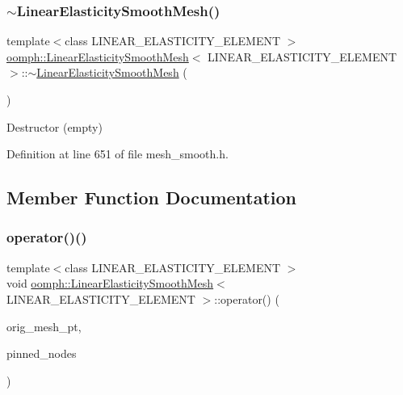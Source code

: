 \subsubsection{\texorpdfstring{$\sim$\+Linear\+Elasticity\+Smooth\+Mesh()}{~LinearElasticitySmoothMesh()}}
{\footnotesize\ttfamily template$<$class L\+I\+N\+E\+A\+R\+\_\+\+E\+L\+A\+S\+T\+I\+C\+I\+T\+Y\+\_\+\+E\+L\+E\+M\+E\+NT $>$ \\
\hyperlink{classoomph_1_1LinearElasticitySmoothMesh}{oomph\+::\+Linear\+Elasticity\+Smooth\+Mesh}$<$ L\+I\+N\+E\+A\+R\+\_\+\+E\+L\+A\+S\+T\+I\+C\+I\+T\+Y\+\_\+\+E\+L\+E\+M\+E\+NT $>$\+::$\sim$\hyperlink{classoomph_1_1LinearElasticitySmoothMesh}{Linear\+Elasticity\+Smooth\+Mesh} (\begin{DoxyParamCaption}{ }\end{DoxyParamCaption})\hspace{0.3cm}{\ttfamily [inline]}}



Destructor (empty) 



Definition at line 651 of file mesh\+\_\+smooth.\+h.



\subsection{Member Function Documentation}
\mbox{\label{classoomph_1_1LinearElasticitySmoothMesh_ada3ce4d2db25f3be160cf3fd83e51a41}} 
\subsubsection{\texorpdfstring{operator()()}{operator()()}}
{\footnotesize\ttfamily template$<$class L\+I\+N\+E\+A\+R\+\_\+\+E\+L\+A\+S\+T\+I\+C\+I\+T\+Y\+\_\+\+E\+L\+E\+M\+E\+NT $>$ \\
void \hyperlink{classoomph_1_1LinearElasticitySmoothMesh}{oomph\+::\+Linear\+Elasticity\+Smooth\+Mesh}$<$ L\+I\+N\+E\+A\+R\+\_\+\+E\+L\+A\+S\+T\+I\+C\+I\+T\+Y\+\_\+\+E\+L\+E\+M\+E\+NT $>$\+::operator() (\begin{DoxyParamCaption}\item[{\hyperlink{classoomph_1_1SolidMesh}{Solid\+Mesh} $\ast$}]{orig\+\_\+mesh\+\_\+pt,  }\item[{std\+::set$<$ \hyperlink{classoomph_1_1Node}{Node} $\ast$$>$}]{pinned\+\_\+nodes }\end{DoxyParamCaption})\hspace{0.3cm}{\ttfamily [inline]}}




